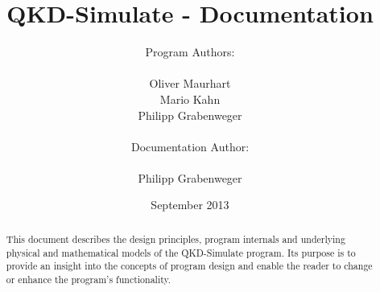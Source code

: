 \documentclass[11pt,oneside,a4paper]{article}
\begin{document}
\title{QKD-Simulate - Documentation}
\author{Program Authors: \\
  \\
  Oliver Maurhart \\
  Mario Kahn \\
  Philipp Grabenweger \\
  \\
  Documentation Author: \\
  \\
  Philipp Grabenweger
}
\date{September 2013}
\maketitle

\newpage

\begin{abstract}
This document describes the design principles, program internals and underlying physical and mathematical models of the QKD-Simulate program. Its purpose is to provide an insight into the concepts of program design and enable the reader to change or enhance the program's functionality.
\end{abstract}

\newpage
\tableofcontents

\listoffigures

\listoftables

\newpage


\newpage


\newpage


\newpage


\newpage


\newpage


\newpage
\appendix
{}


\end{document}
